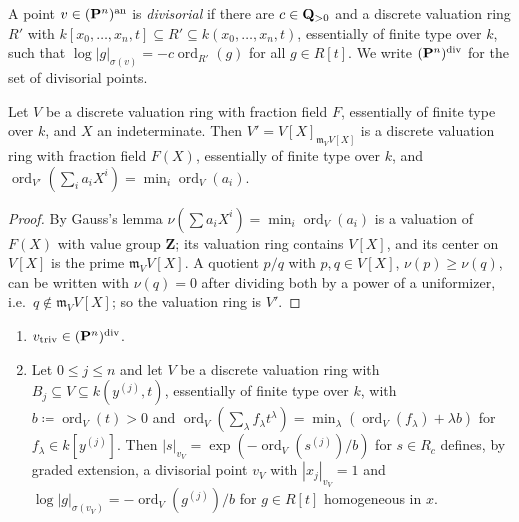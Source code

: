 \begin{definition}\label{def:pn-div}
\leanok
{}
A point $v\in(\mathbf{P}^n)^{\mathrm{an}}$ is \emph{divisorial} if there are $c\in\mathbf{Q}_{>0}$ and a discrete valuation ring
$R'$ with $k[x_0,\dots,x_n,t]\subseteq R'\subseteq k(x_0,\dots,x_n,t)$, essentially of finite type over $k$,
such that $\log|g|_{\sigma(v)}=-c\operatorname{ord}_{R'}(g)$ for all $g\in R[t]$. We write $(\mathbf{P}^n)^{\mathrm{div}}$ for the set of
divisorial points.
\end{definition}

\begin{lemma}\label{lem:bj-gauss-dvr}
\leanok
Let $V$ be a discrete valuation ring with fraction field $F$, essentially of finite type over $k$, and $X$
an indeterminate. Then $V'=V[X]_{\mathfrak m_VV[X]}$ is a discrete valuation ring with fraction field
$F(X)$, essentially of finite type over $k$, and $\operatorname{ord}_{V'}(\sum_ia_iX^i)=\min_i\operatorname{ord}_V(a_i)$.
\end{lemma}

\begin{proof}
By Gauss's lemma $\nu(\sum a_iX^i)=\min_i\operatorname{ord}_V(a_i)$ is a valuation of $F(X)$ with value group $\mathbf{Z}$; its
valuation ring contains $V[X]$, and its center on $V[X]$ is the prime $\mathfrak m_VV[X]$. A quotient
$p/q$ with $p,q\in V[X]$, $\nu(p)\ge\nu(q)$, can be written with $\nu(q)=0$ after dividing both by a power of
a uniformizer, i.e.\ $q\notin\mathfrak m_VV[X]$; so the valuation ring is $V'$.
\end{proof}

\begin{lemma}\label{lem:bj-div-points}
\leanok
{}
\begin{enumerate}
\item $v_{\mathrm{triv}}\in(\mathbf{P}^n)^{\mathrm{div}}$.
\item Let $0\le j\le n$ and let $V$ be a discrete valuation ring with $B_j\subseteq V\subseteq k(y^{(j)},t)$,
essentially of finite type over $k$, with $b\coloneqq\operatorname{ord}_V(t)>0$ and
$\operatorname{ord}_V(\sum_\lambda f_\lambda t^\lambda)=\min_\lambda(\operatorname{ord}_V(f_\lambda)+\lambda b)$ for $f_\lambda\in k[y^{(j)}]$.
Then $|s|_{v_V}=\exp(-\operatorname{ord}_V(s^{(j)})/b)$ for $s\in R_c$ defines, by graded extension, a divisorial point
$v_V$ with $|x_j|_{v_V}=1$ and $\log|g|_{\sigma(v_V)}=-\operatorname{ord}_V(g^{(j)})/b$ for $g\in R[t]$ homogeneous in $x$.
\end{enumerate}
\end{lemma}

